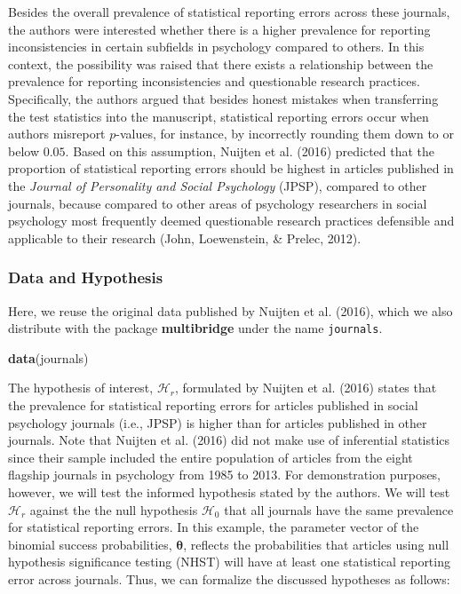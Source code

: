 \documentclass[
  english,
  man,floatsintext]{apa6}
\newenvironment{Shaded}{\begin{snugshade}}{\end{snugshade}}
\newcommand{\KeywordTok}[1]{\textcolor[rgb]{0.13,0.29,0.53}{\textbf{#1}}}
\newcommand{\NormalTok}[1]{#1}
\begin{document}
Besides the overall prevalence of statistical reporting errors across these journals, the authors were interested whether there is a higher prevalence for reporting inconsistencies in certain subfields in psychology compared to others. In this context, the possibility was raised that there exists a relationship between the prevalence for reporting inconsistencies and questionable research practices. Specifically, the authors argued that besides honest mistakes when transferring the test statistics into the manuscript, statistical reporting errors occur when authors misreport \(p\)-values, for instance, by incorrectly rounding them down to or below \(0.05\). Based on this assumption, Nuijten et al. (2016) predicted that the proportion of statistical reporting errors should be highest in articles published in the \emph{Journal of Personality and Social Psychology} (JPSP), compared to other journals, because compared to other areas of psychology researchers in social psychology most frequently deemed questionable research practices defensible and applicable to their research (John, Loewenstein, \& Prelec, 2012).

\hypertarget{data-and-hypothesis-1}{%
\subsubsection{Data and Hypothesis}\label{data-and-hypothesis-1}}

Here, we reuse the original data published by Nuijten et al. (2016), which we also distribute with the package \textbf{multibridge} under the name \texttt{journals}.

\begin{Shaded}
\begin{Highlighting}[]
\KeywordTok{data}\NormalTok{(journals)}
\end{Highlighting}
\end{Shaded}

The hypothesis of interest, \(\mathcal{H}_r\), formulated by Nuijten et al. (2016) states that the prevalence for statistical reporting errors for articles published in social psychology journals (i.e., JPSP) is higher than for articles published in other journals. Note that Nuijten et al. (2016) did not make use of inferential statistics since their sample included the entire population of articles from the eight flagship journals in psychology from 1985 to 2013. For demonstration purposes, however, we will test the informed hypothesis stated by the authors. We will test \(\mathcal{H}_r\) against the the null hypothesis \(\mathcal{H}_0\) that all journals have the same prevalence for statistical reporting errors. In this example, the parameter vector of the binomial success probabilities, \(\boldsymbol{\theta}\), reflects the probabilities that articles using null hypothesis significance testing (NHST) will have at least one statistical reporting error across journals. Thus, we can formalize the discussed hypotheses as follows:
\end{document}

